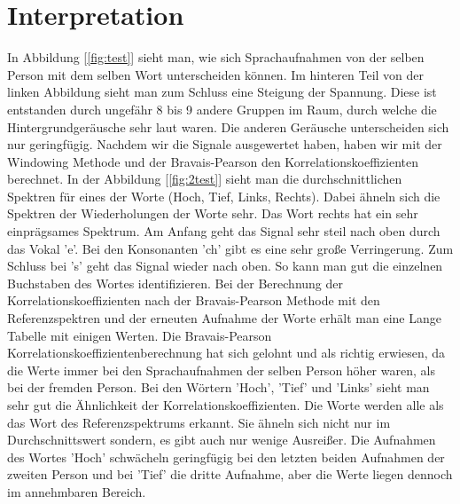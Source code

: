 \documentclass[12pt, oneside, a4paper, \docLanguage]{report}
\begin{document}
\section{Interpretation}
\label{chap:VERSUCH_2_INTERPRETATION}
In Abbildung [\ref{fig:test}] sieht man, wie sich Sprachaufnahmen von der selben Person mit dem selben Wort unterscheiden können.
Im hinteren Teil von der linken Abbildung sieht man zum Schluss eine Steigung der Spannung. 
\newline
Diese ist entstanden durch ungefähr 8 bis 9 andere Gruppen im Raum, durch welche die Hintergrundgeräusche sehr laut waren.
Die anderen Geräusche unterscheiden sich nur geringfügig.
\newline
\newline
Nachdem wir die Signale ausgewertet haben, haben wir mit der Windowing Methode und der Bravais-Pearson den Korrelationskoeffizienten berechnet.
In der Abbildung [\ref{fig:2test}] sieht man die durchschnittlichen Spektren für eines der Worte (Hoch, Tief, Links, Rechts).
\newline
Dabei ähneln sich die Spektren der Wiederholungen der Worte sehr. Das Wort rechts hat ein sehr einprägsames Spektrum. 
\newline
Am Anfang geht das Signal sehr steil nach oben durch das Vokal 'e'.
Bei den Konsonanten 'ch' gibt es eine sehr große Verringerung. Zum Schluss bei 's' geht das Signal wieder nach oben.
So kann man gut die einzelnen Buchstaben des Wortes identifizieren.
\newline
\newline
Bei der Berechnung der Korrelationskoeffizienten nach der Bravais-Pearson Methode mit den Referenzspektren und der erneuten Aufnahme der Worte erhält man eine Lange Tabelle mit einigen Werten.
\newline
Die Bravais-Pearson Korrelationskoeffizientenberechnung hat sich gelohnt und als richtig erwiesen, da die Werte immer bei den Sprachaufnahmen der selben Person höher waren, als bei der fremden Person.
\newline
Bei den Wörtern 'Hoch', 'Tief' und 'Links' sieht man sehr gut die Ähnlichkeit der Korrelationskoeffizienten. Die Worte werden alle als das Wort des Referenzspektrums erkannt.
Sie ähneln sich nicht nur im Durchschnittswert sondern, es gibt auch nur wenige Ausreißer.
Die Aufnahmen des Wortes 'Hoch' schwächeln geringfügig bei den letzten beiden Aufnahmen der zweiten Person und bei 'Tief' die dritte Aufnahme, aber die Werte liegen dennoch im annehmbaren Bereich.
\newline
\end{document}
